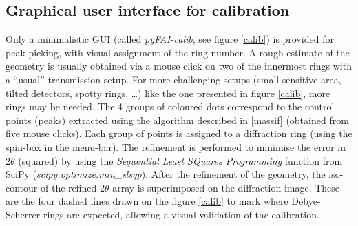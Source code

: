\documentclass{iucr}
\begin{document}
\subsection{Graphical user interface for calibration}
\label{gui_calib}
Only a minimalistic GUI (called
\textit{pyFAI-calib}, see figure \ref{calib}) is provided
for peak-picking, with visual assignment of the ring number.
A rough estimate of the geometry is usually obtained via a mouse click on
two of the innermost rings with a ``usual'' transmission setup. 
For more challenging setups (small sensitive area, tilted detectors, spotty
rings, \ldots) like the one presented in figure \ref{calib}, more rings may
be needed.
The 4 groups of coloured dots correspond to the control points (peaks) extracted
using the algorithm described in \ref{massif} (obtained from five mouse
clicks). Each group of points is assigned to a diffraction ring (using the
spin-box in the menu-bar).
The refinement is performed to minimise the error in $2\theta$ (squared) by
using the \textit{Sequential Least SQuares Programming} function from
SciPy (\textit{scipy.optimize.min\_slsqp}).
After the refinement of the geometry, the iso-contour of the refined $2\theta$ array is
superimposed on the diffraction image.
These are the four dashed lines
drawn on the figure \ref{calib} to mark where Debye-Scherrer rings are
expected, allowing a visual validation of the calibration.
\end{document}
